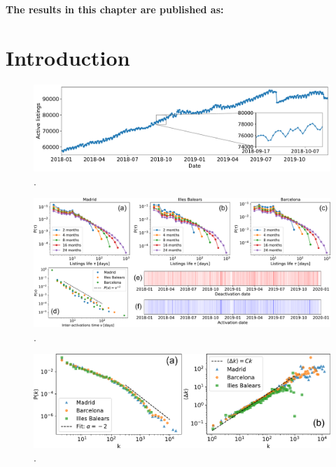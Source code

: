 \vspace{-1.5cm}
\small
\textbf{The results in this chapter are published as:}
\vspace{0.05 cm}

\normalsize
\vspace{0.5 cm}

\section{Introduction}

\begin{figure}
    \label{fig:active_adds}
    \centering
    \includegraphics[width =\textwidth]{Figs/Idealista_dynamics/active_adds.pdf}
	\caption[.]{ . }
\end{figure}

\begin{figure}
    \label{fig:panel_time}
    \centering
    \includegraphics[width =\textwidth]{Figs/Idealista_dynamics/panel_time.pdf}
	\caption[.]{ . }
\end{figure}

\begin{figure}
    \label{fig:panel_degree}
    \centering
    \includegraphics[width =\textwidth]{Figs/Idealista_dynamics/panel_degree.pdf}
	\caption[.]{ . }
\end{figure}

